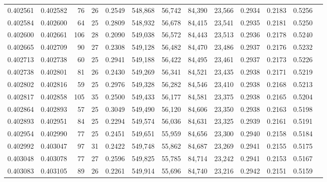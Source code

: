 \begin{tabular}{rrrrrrrrrrrrr}
0.402561 & 0.402582 &    76 &  26 &                                     0.2549 & 548,868 &  56,742 &  84,390 &  23,566 & 0.2934 & 0.2183 & 0.5256 \\
0.402584 & 0.402600 &    64 &  25 &                                     0.2809 & 548,932 &  56,678 &  84,415 &  23,541 & 0.2935 & 0.2181 & 0.5250 \\
0.402600 & 0.402661 &   106 &  28 &                                     0.2090 & 549,038 &  56,572 &  84,443 &  23,513 & 0.2936 & 0.2178 & 0.5240 \\
0.402665 & 0.402709 &    90 &  27 &                                     0.2308 & 549,128 &  56,482 &  84,470 &  23,486 & 0.2937 & 0.2176 & 0.5232 \\
0.402713 & 0.402738 &    60 &  25 &                                     0.2941 & 549,188 &  56,422 &  84,495 &  23,461 & 0.2937 & 0.2173 & 0.5226 \\
0.402738 & 0.402801 &    81 &  26 &                                     0.2430 & 549,269 &  56,341 &  84,521 &  23,435 & 0.2938 & 0.2171 & 0.5219 \\
0.402802 & 0.402816 &    59 &  25 &                                     0.2976 & 549,328 &  56,282 &  84,546 &  23,410 & 0.2938 & 0.2168 & 0.5213 \\
0.402817 & 0.402858 &   105 &  35 &                                     0.2500 & 549,433 &  56,177 &  84,581 &  23,375 & 0.2938 & 0.2165 & 0.5204 \\
0.402864 & 0.402893 &    57 &  25 &                                     0.3049 & 549,490 &  56,120 &  84,606 &  23,350 & 0.2938 & 0.2163 & 0.5198 \\
0.402893 & 0.402951 &    84 &  25 &                                     0.2294 & 549,574 &  56,036 &  84,631 &  23,325 & 0.2939 & 0.2161 & 0.5191 \\
0.402954 & 0.402990 &    77 &  25 &                                     0.2451 & 549,651 &  55,959 &  84,656 &  23,300 & 0.2940 & 0.2158 & 0.5184 \\
0.402992 & 0.403047 &    97 &  31 &                                     0.2422 & 549,748 &  55,862 &  84,687 &  23,269 & 0.2941 & 0.2155 & 0.5175 \\
0.403048 & 0.403078 &    77 &  27 &                                     0.2596 & 549,825 &  55,785 &  84,714 &  23,242 & 0.2941 & 0.2153 & 0.5167 \\
0.403083 & 0.403105 &    89 &  26 &                                     0.2261 & 549,914 &  55,696 &  84,740 &  23,216 & 0.2942 & 0.2151 & 0.5159 \\

\end{tabular}
